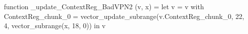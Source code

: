 function _update_ContextReg_BadVPN2 (v, x) = let v = { v with ContextReg_chunk_0 = vector_update_subrange(v.ContextReg_chunk_0, 22, 4, vector_subrange(x, 18, 0)) } in v
